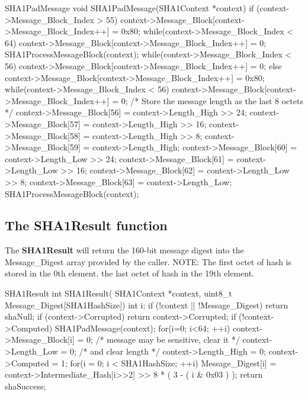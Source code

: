 \begin{chunk}{SHA1PadMessage}
void SHA1PadMessage(SHA1Context *context) {
  if (context->Message_Block_Index > 55) {
    context->Message_Block[context->Message_Block_Index++] = 0x80;
    while(context->Message_Block_Index < 64) {
      context->Message_Block[context->Message_Block_Index++] = 0;
    }
    SHA1ProcessMessageBlock(context);
    while(context->Message_Block_Index < 56) {
      context->Message_Block[context->Message_Block_Index++] = 0;
    }
  } else {
    context->Message_Block[context->Message_Block_Index++] = 0x80;
    while(context->Message_Block_Index < 56) {
     context->Message_Block[context->Message_Block_Index++] = 0;
    }
  }
  /* Store the message length as the last 8 octets */
  context->Message_Block[56] = context->Length_High >> 24;
  context->Message_Block[57] = context->Length_High >> 16;
  context->Message_Block[58] = context->Length_High >> 8;
  context->Message_Block[59] = context->Length_High;
  context->Message_Block[60] = context->Length_Low >> 24;
  context->Message_Block[61] = context->Length_Low >> 16;
  context->Message_Block[62] = context->Length_Low >> 8;
  context->Message_Block[63] = context->Length_Low;
  SHA1ProcessMessageBlock(context);
}

\end{chunk}

\subsection{The SHA1Result function}
The {\bf SHA1Result} will return the 160-bit message digest into the
Message\_Digest array  provided by the caller. 
NOTE: The first octet of hash is stored in the 0th element,
the last octet of hash in the 19th element.
\begin{chunk}{SHA1Result}
int SHA1Result( SHA1Context *context, uint8_t Message_Digest[SHA1HashSize]) {
  int i;
  if (!context || !Message_Digest) {
    return shaNull;
  }
  if (context->Corrupted) {
    return context->Corrupted;
  }
  if (!context->Computed) {
    SHA1PadMessage(context);
    for(i=0; i<64; ++i) {
      context->Message_Block[i] = 0; /* message may be sensitive, clear it */
    }
    context->Length_Low = 0;         /* and clear length */
    context->Length_High = 0;
    context->Computed = 1;
  }
  for(i = 0; i < SHA1HashSize; ++i) {
    Message_Digest[i] = 
      context->Intermediate_Hash[i>>2] >> 8 * ( 3 - ( i & 0x03 ) );
  }
  return shaSuccess;
}

\end{chunk}

